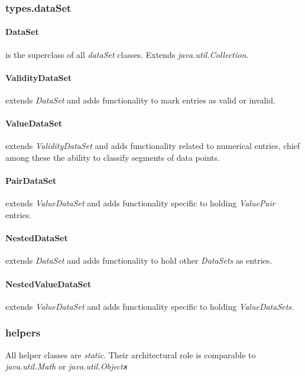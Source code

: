 \documentclass{article}
\begin{document}
  \subsubsection*{types.dataSet}
  
  \paragraph{DataSet} is the superclass of all \textit{dataSet} classes. Extends \textit{java.util.Collection}.
  
  \paragraph{ValidityDataSet} extends \textit{DataSet} and adds functionality to mark entries as valid or invalid.
  
  \paragraph{ValueDataSet} extends \textit{ValidityDataSet} and adds functionality related to numerical entries, chief among these the ability to classify segments of data points.
  
  \paragraph{PairDataSet} extends \textit{ValueDataSet} and adds functionality specific to holding \textit{ValuePair} entries.
  
  \paragraph{NestedDataSet} extends \textit{DataSet} and adds functionality to hold other \textit{DataSets} as entries.
  
  \paragraph{NestedValueDataSet} extends \textit{ValueDataSet} and adds functionality specific to holding \textit{ValueDataSets}.
  
  \subsubsection*{helpers}
  
  All helper classes are \textit{static}. Their architectural role is comparable to \textit{java.util.Math} or \textit{java.util.Object\textbf{s}}
  
\end{document}
